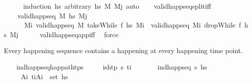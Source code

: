 \begin{isabellebody}
%
\isadelimproof
\ \ \ \ %
\endisadelimproof
%
\isatagproof
{}\isamarkupfalse%
\ {\isacharparenleft}{\kern0pt}induction\ hs\ arbitrary{\isacharcolon}{\kern0pt}\ hs\ M\ M\isactrlsub j{\isacharparenright}{\kern0pt}\ auto%
\endisatagproof
{\isafoldproof}%
%
\isadelimproof
\isanewline
%
\endisadelimproof
\isanewline
\ \ \isamarkupfalse%
\ valid{\isacharunderscore}{\kern0pt}happ{\isacharunderscore}{\kern0pt}seq{\isacharunderscore}{\kern0pt}split{\isacharunderscore}{\kern0pt}iff{\isacharcolon}{\kern0pt}\isanewline
\ \ \ \ {\isachardoublequoteopen}valid{\isacharunderscore}{\kern0pt}happ{\isacharunderscore}{\kern0pt}seq\ M\ hs\ M\isactrlsub j\ {\isasymlongleftrightarrow}\ \isanewline
\ \ \ \ \ \ {\isacharparenleft}{\kern0pt}{\isasymexists}M\isactrlsub i{\isachardot}{\kern0pt}\ valid{\isacharunderscore}{\kern0pt}happ{\isacharunderscore}{\kern0pt}seq\ M\ {\isacharparenleft}{\kern0pt}takeWhile\ f\ hs{\isacharparenright}{\kern0pt}\ M\isactrlsub i\ {\isasymand}\ valid{\isacharunderscore}{\kern0pt}happ{\isacharunderscore}{\kern0pt}seq\ M\isactrlsub i\ {\isacharparenleft}{\kern0pt}dropWhile\ f\ hs{\isacharparenright}{\kern0pt}\ M\isactrlsub j{\isacharparenright}{\kern0pt}{\isachardoublequoteclose}\isanewline
%
\isadelimproof
\ \ \ \ %
\endisadelimproof
%
\isatagproof
{}\isamarkupfalse%
\ valid{\isacharunderscore}{\kern0pt}happ{\isacharunderscore}{\kern0pt}seq{\isacharunderscore}{\kern0pt}app{\isacharunderscore}{\kern0pt}iff\ \isamarkupfalse%
\ force%
\endisatagproof
{\isafoldproof}%
%
\isadelimproof
%
\endisadelimproof
%
\begin{isamarkuptext}%
Every happening sequence contains a happening at every happening time point.%
\end{isamarkuptext}\isamarkuptrue%
\ \ \isamarkupfalse%
\ ind{\isacharunderscore}{\kern0pt}happ{\isacharunderscore}{\kern0pt}seq{\isacharunderscore}{\kern0pt}happ{\isacharunderscore}{\kern0pt}at{\isacharunderscore}{\kern0pt}htps{\isacharcolon}{\kern0pt}\isanewline
\ \ \ \ \ {\isachardoublequoteopen}is{\isacharunderscore}{\kern0pt}htp\ {\isasympi}s\ t\isactrlsub i{\isachardoublequoteclose}\isanewline
\ \ \ \ \ \ \ {\isachardoublequoteopen}ind{\isacharunderscore}{\kern0pt}happ{\isacharunderscore}{\kern0pt}seq\ {\isasympi}s\ hs{\isachardoublequoteclose}\isanewline
\ \ \ \ \ {\isachardoublequoteopen}{\isasymexists}A\isactrlsub i{\isachardot}{\kern0pt}\ {\isacharparenleft}{\kern0pt}t\isactrlsub i{\isacharcomma}{\kern0pt}A\isactrlsub i{\isacharparenright}{\kern0pt}\ {\isasymin}\ set\ hs{\isachardoublequoteclose}\isanewline

\end{isabellebody}
